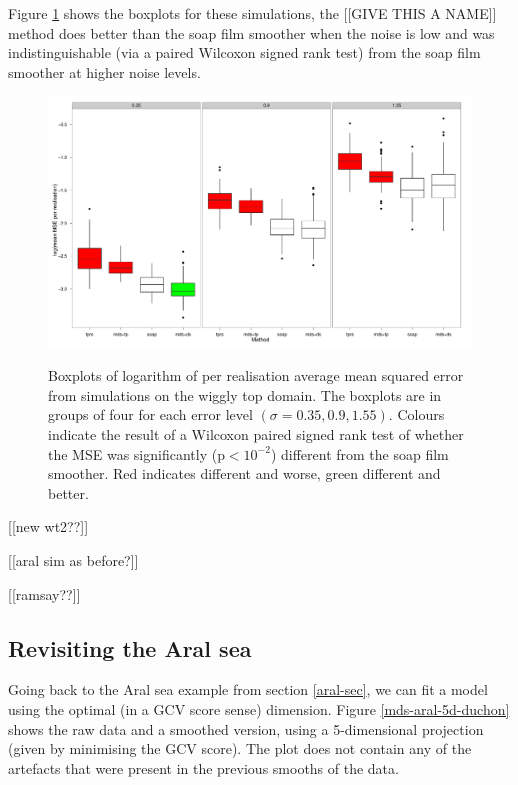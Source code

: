 Figure \ref{wt2-boxplot-duchon} shows the boxplots for these simulations, the [[GIVE THIS A NAME]] method does better than the soap film smoother when the noise is low and was indistinguishable (via a paired Wilcoxon signed rank test) from the soap film smoother at higher noise levels.

\begin{figure}
\centering
\includegraphics[width=6in]{mds/figs/wt2-boxplot-duchon.pdf} \\
\caption{Boxplots of logarithm of per realisation average mean squared error from simulations on the wiggly top domain. The boxplots are in groups of four for each error level $(\sigma = 0.35, 0.9, 1.55)$. Colours indicate the result of a Wilcoxon paired signed rank test of whether the MSE was significantly (p$<10^{-2}$) different from the soap film smoother. Red indicates different and worse, green different and better.}
\label{wt2-boxplot-duchon}
\end{figure}

[[new wt2??]]

[[aral sim as before?]]

[[ramsay??]]



\subsection{Revisiting the Aral sea}

Going back to the Aral sea example from section \ref{aral-sec}, we can fit a model using the optimal (in a GCV score sense) dimension. Figure \ref{mds-aral-5d-duchon} shows the raw data and a smoothed version, using a 5-dimensional projection (given by minimising the GCV score). The plot does not contain any of the artefacts that were present in the previous smooths of the data.


